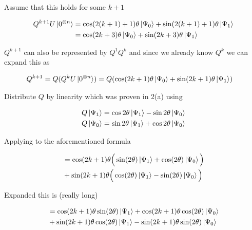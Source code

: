 \documentclass[11pt]{article}
\newcommand{\ztimesn}{0^{\otimes n}}
\begin{document}
\begin{enumerate}
\begin{enumerate}
		            Assume that this holds for some $k+1$

		            \begin{align*}
			            Q^{k+1}U\ket{\ztimesn} & = \cos(2(k+1)+1)\theta\ket{\Psi_0} + \sin(2(k+1)+1)\theta\ket{\Psi_1} \\
			                                   & = \cos(2k+3)\theta\ket{\Psi_0} + \sin(2k+3)\theta\ket{\Psi_1}         \\
		            \end{align*}

		            $Q^{k+1}$ can also be represented by $Q^1Q^k$ and since we already know $Q^k$ we can expand this as

		            \begin{align*}
			            Q^{k+1} = Q(Q^k U \ket{\ztimesn}) & = Q(\cos(2k+1)\theta\ket{\Psi_0}+\sin(2k+1)\theta\ket{\Psi_1})
		            \end{align*}

		            Distribute $Q$ by linearity which was proven in 2(a) using

		            \begin{align*}
			            Q\ket{\Psi_1} & = \cos 2\theta\ket{\Psi_1} - \sin 2\theta\ket{\Psi_0} \\
			            Q\ket{\Psi_0} & = \sin 2\theta\ket{\Psi_1} + \cos 2\theta\ket{\Psi_0} \\
		            \end{align*}

		            Applying to the aforementioned formula

		            \begin{align*}
			             & = \cos(2k+1)\theta\Big(\sin(2\theta)\ket{\Psi_1}+\cos(2\theta)\ket{\Psi_0}\Big) \\
			             & + \sin(2k+1)\theta\Big(\cos(2\theta)\ket{\Psi_1}-\sin(2\theta)\ket{\Psi_0}\Big) \\
		            \end{align*}

		            Expanded this is (really long)

		            \begin{align*}
			             & = \cos(2k+1)\theta\sin(2\theta)\ket{\Psi_1}+\cos(2k+1)\theta\cos(2\theta)\ket{\Psi_0} \\
			             & + \sin(2k+1)\theta\cos(2\theta)\ket{\Psi_1}-\sin(2k+1)\theta\sin(2\theta)\ket{\Psi_0}
		            \end{align*}


\end{enumerate}
\end{enumerate}
\end{document}
